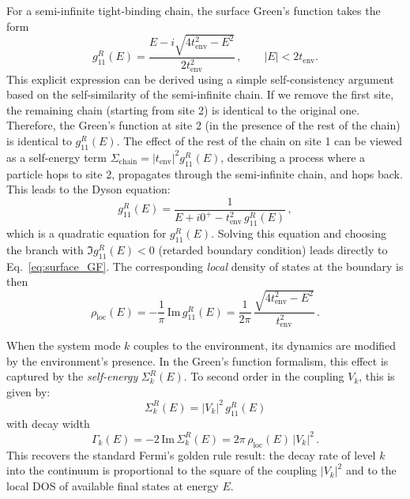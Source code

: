 \documentclass[12pt,oneside,openright]{report}
\theoremstyle{definition}
\theoremstyle{plain}
\theoremstyle{remark}
\begin{document}
For a semi-infinite tight-binding chain, the surface Green's function takes the form
\begin{equation}
 g^{R}_{11}(E) = \frac{E - i\sqrt{4 t_{\mathrm{env}}^2 - E^2}}{2 t_{\mathrm{env}}^2}\,, \qquad |E|<2 t_{\mathrm{env}}.
 \label{eq:surface_GF}
\end{equation}
This explicit expression can be derived using a simple self-consistency argument based on the self-similarity of the semi-infinite chain. If we remove the first site, the remaining chain (starting from site 2) is identical to the original one. Therefore, the Green's function at site 2 (in the presence of the rest of the chain) is identical to $g^{R}_{11}(E)$.
The effect of the rest of the chain on site 1 can be viewed as a self-energy term $\Sigma_{\mathrm{chain}} = |t_{\mathrm{env}}|^2 g^{R}_{11}(E)$, describing a process where a particle hops to site 2, propagates through the semi-infinite chain, and hops back.
This leads to the Dyson equation:
\begin{equation}
 g^{R}_{11}(E) = \frac{1}{E + i0^+ - t_{\mathrm{env}}^2 \, g^{R}_{11}(E)}\,,
\end{equation}
which is a quadratic equation for $g^{R}_{11}(E)$. Solving this equation and choosing the branch
with $\Im g^{R}_{11}(E) < 0$ (retarded boundary condition) leads directly to Eq.~\eqref{eq:surface_GF}.
The corresponding \emph{local} density of states at the boundary is then
\begin{equation}
 \rho_{\mathrm{loc}}(E) = -\frac{1}{\pi}\,\mathrm{Im}\, g^{R}_{11}(E)
 = \frac{1}{2\pi}\,\frac{\sqrt{4 t_{\mathrm{env}}^2 - E^2}}{t_{\mathrm{env}}^2}\,.
 \label{eq:rho_loc}
\end{equation}

When the system mode $k$ couples to the environment, its dynamics are modified by the environment's presence. In the Green's function formalism, this effect is captured by the \emph{self-energy} $\Sigma_k^{R}(E)$. To second order in the coupling $V_k$, this is given by:
\begin{equation}
 \Sigma_k^{R}(E) = |V_k|^2\, g^{R}_{11}(E)
 \label{eq:self_energy_def}
\end{equation}
with decay width
\begin{equation}
 \Gamma_k(E) = -2\,\mathrm{Im}\,\Sigma_k^{R}(E) = 2\pi\, \rho_{\mathrm{loc}}(E)\, |V_k|^2\,.
 \label{eq:Gamma_from_rho_loc}
\end{equation}
This recovers the standard Fermi's golden rule result: the decay rate of level $k$ into the continuum
is proportional to the square of the coupling $|V_k|^2$ and to the local DOS of available final
states at energy $E$.
\end{document}
